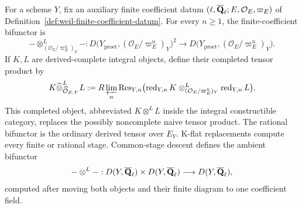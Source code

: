 \begin{definition}
\label{def:derived-tensor-product}


For a scheme \(Y\), fix an auxiliary finite coefficient datum
\((\ell,\overline{\mathbf Q}_\ell;E,\mathcal O_E,\varpi_E)\) of
Definition~\ref{def:weil-finite-coefficient-datum}.
For every \(n\geq1\), the finite-coefficient bifunctor is
\[
 -\otimes^L_{(\mathcal O_E/\varpi_E^n)_Y}-:
 D\bigl(Y_{\mathrm{proet}},(\mathcal O_E/\varpi_E^n)_Y\bigr)^2
 \longrightarrow
 D\bigl(Y_{\mathrm{proet}},(\mathcal O_E/\varpi_E^n)_Y\bigr).
\]
If \(K,L\) are derived-complete integral objects, define their completed
tensor product by
\[
 K\widehat\otimes^L_{\widehat{\mathcal O}_{E,Y}}L
 :=R\varprojlim_n\operatorname{Res}_{Y,n}
 \bigl(\operatorname{red}_{Y,n}K\otimes^L_{(\mathcal O_E/\varpi_E^n)_Y}
       \operatorname{red}_{Y,n}L\bigr).
\]
This completed object, abbreviated \(K\otimes^L L\) inside the integral
constructible category, replaces the possibly noncomplete naive tensor
product.  The rational bifunctor is the ordinary derived tensor over
\(E_Y\).  K-flat replacements compute every finite or rational stage.
Common-stage descent defines the ambient bifunctor
\[
 -\otimes^L-:D(Y,\overline{\mathbf Q}_\ell)\times D(Y,\overline{\mathbf Q}_\ell)\longrightarrow D(Y,\overline{\mathbf Q}_\ell),
\]
computed after moving both objects and their finite diagram to one
coefficient field.
\end{definition}


